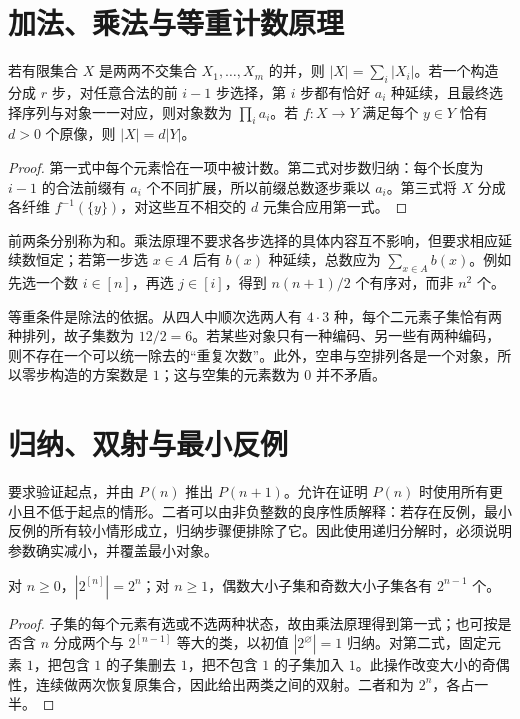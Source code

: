 \documentclass[UTF8,12pt,a4paper,fontset=fandol]{ctexbook}
\begin{document}
\section{加法、乘法与等重计数原理}

\begin{theorem}[基本计数原理]
若有限集合 $X$ 是两两不交集合 $X_1,\ldots,X_m$ 的并，则 $|X|=\sum_i|X_i|$。若一个构造分成 $r$ 步，对任意合法的前 $i-1$ 步选择，第 $i$ 步都有恰好 $a_i$ 种延续，且最终选择序列与对象一一对应，则对象数为 $\prod_i a_i$。若 $f:X\to Y$ 满足每个 $y\in Y$ 恰有 $d>0$ 个原像，则 $|X|=d|Y|$。
\end{theorem}
\begin{proof}
第一式中每个元素恰在一项中被计数。第二式对步数归纳：每个长度为 $i-1$ 的合法前缀有 $a_i$ 个不同扩展，所以前缀总数逐步乘以 $a_i$。第三式将 $X$ 分成各纤维 $f^{-1}(\{y\})$，对这些互不相交的 $d$ 元集合应用第一式。
\end{proof}

前两条分别称为和。乘法原理不要求各步选择的具体内容互不影响，但要求相应延续数恒定；若第一步选 $x\in A$ 后有 $b(x)$ 种延续，总数应为 $\sum_{x\in A}b(x)$。例如先选一个数 $i\in[n]$，再选 $j\in[i]$，得到 $n(n+1)/2$ 个有序对，而非 $n^2$ 个。

等重条件是除法的依据。从四人中顺次选两人有 $4\cdot3$ 种，每个二元素子集恰有两种排列，故子集数为 $12/2=6$。若某些对象只有一种编码、另一些有两种编码，则不存在一个可以统一除去的“重复次数”。此外，空串与空排列各是一个对象，所以零步构造的方案数是 $1$；这与空集的元素数为 $0$ 并不矛盾。

\section{归纳、双射与最小反例}

要求验证起点，并由 $P(n)$ 推出 $P(n+1)$。允许在证明 $P(n)$ 时使用所有更小且不低于起点的情形。二者可以由非负整数的良序性质解释：若存在反例，最小反例的所有较小情形成立，归纳步骤便排除了它。因此使用递归分解时，必须说明参数确实减小，并覆盖最小对象。

\begin{proposition}
对 $n\ge0$，$|2^{[n]}|=2^n$；对 $n\ge1$，偶数大小子集和奇数大小子集各有 $2^{n-1}$ 个。
\end{proposition}
\begin{proof}
子集的每个元素有选或不选两种状态，故由乘法原理得到第一式；也可按是否含 $n$ 分成两个与 $2^{[n-1]}$ 等大的类，以初值 $|2^{\varnothing}|=1$ 归纳。对第二式，固定元素 $1$，把包含 $1$ 的子集删去 $1$，把不包含 $1$ 的子集加入 $1$。此操作改变大小的奇偶性，连续做两次恢复原集合，因此给出两类之间的双射。二者和为 $2^n$，各占一半。
\end{proof}
\end{document}
